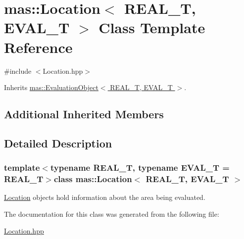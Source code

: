 \hypertarget{classmas_1_1_location}{}\section{mas\+:\+:Location$<$ R\+E\+A\+L\+\_\+\+T, E\+V\+A\+L\+\_\+\+T $>$ Class Template Reference}
\label{classmas_1_1_location}


{\ttfamily \#include $<$Location.\+hpp$>$}



Inherits \hyperlink{classmas_1_1_evaluation_object}{mas\+::\+Evaluation\+Object$<$ R\+E\+A\+L\+\_\+\+T, E\+V\+A\+L\+\_\+\+T $>$}.

\subsection*{Additional Inherited Members}


\subsection{Detailed Description}
\subsubsection*{template$<$typename R\+E\+A\+L\+\_\+\+T, typename E\+V\+A\+L\+\_\+\+T = R\+E\+A\+L\+\_\+\+T$>$class mas\+::\+Location$<$ R\+E\+A\+L\+\_\+\+T, E\+V\+A\+L\+\_\+\+T $>$}

\hyperlink{classmas_1_1_location}{Location} objects hold information about the area being evaluated. 

The documentation for this class was generated from the following file\+:\begin{DoxyCompactItemize}
\item 
\hyperlink{_location_8hpp}{Location.\+hpp}\end{DoxyCompactItemize}
